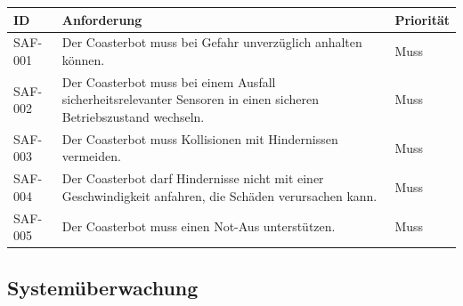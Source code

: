 \begin{longtable}[]{@{}
  >{\raggedright\arraybackslash}p{}
  >{\raggedright\arraybackslash}p{}
  >{\raggedright\arraybackslash}p{}@{}}
\toprule\noalign{}
\begin{minipage}[b]{\linewidth}\raggedright
ID
\end{minipage} & \begin{minipage}[b]{\linewidth}\raggedright
Anforderung
\end{minipage} & \begin{minipage}[b]{\linewidth}\raggedright
Priorität
\end{minipage} \\
\midrule\noalign{}
\endhead
\bottomrule\noalign{}
\endlastfoot
SAF-001 & Der Coasterbot muss bei Gefahr unverzüglich anhalten können. &
Muss \\
SAF-002 & Der Coasterbot muss bei einem Ausfall sicherheitsrelevanter
Sensoren in einen sicheren Betriebszustand wechseln. & Muss \\
SAF-003 & Der Coasterbot muss Kollisionen mit Hindernissen vermeiden. &
Muss \\
SAF-004 & Der Coasterbot darf Hindernisse nicht mit einer
Geschwindigkeit anfahren, die Schäden verursachen kann. & Muss \\
SAF-005 & Der Coasterbot muss einen Not-Aus unterstützen. & Muss \\
\end{longtable}

\subsection{Systemüberwachung}\label{systemuxfcberwachung}

